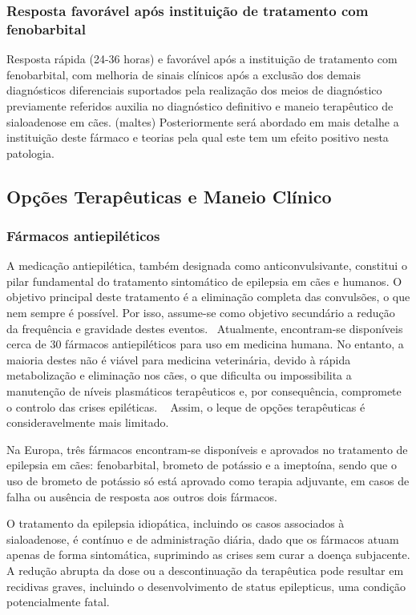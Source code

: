 \subsubsection{Resposta favorável após instituição de tratamento com fenobarbital}

Resposta rápida (24-36 horas) e favorável após a instituição de tratamento com fenobarbital, com melhoria de sinais clínicos após a exclusão dos demais diagnósticos diferenciais suportados pela realização dos meios de diagnóstico previamente referidos auxilia no diagnóstico definitivo e maneio terapêutico de sialoadenose em cães. (maltes) Posteriormente será abordado em mais detalhe a instituição deste fármaco e teorias pela qual este tem um efeito positivo nesta patologia. 

\subsection{Opções Terapêuticas e Maneio Clínico} 


\subsubsection{Fármacos antiepiléticos}


A medicação antiepilética, também designada como anticonvulsivante, constitui o pilar fundamental do tratamento sintomático de epilepsia em cães e humanos. O objetivo principal deste tratamento é a eliminação completa das convulsões, o que nem sempre é possível. Por isso, assume-se como objetivo secundário a redução da frequência e gravidade destes eventos.~\cite{Loscher2022}
Atualmente, encontram-se disponíveis cerca de 30 fármacos antiepiléticos para uso em medicina humana. No entanto, a maioria destes não é viável para medicina veterinária, devido à rápida metabolização e eliminação nos cães, o que dificulta ou impossibilita a manutenção de níveis plasmáticos terapêuticos e, por consequência, compromete o controlo das crises epiléticas. ~\cite{Loscher2022} Assim, o leque de opções terapêuticas é consideravelmente mais limitado. ~\cite{Loscher2022}


Na Europa, três fármacos encontram-se disponíveis e aprovados no tratamento de epilepsia em cães: fenobarbital, brometo de potássio e a imeptoína, sendo que o uso de brometo de potássio só está aprovado como terapia adjuvante, em casos de falha ou ausência de resposta aos outros dois fármacos. ~\cite{Royaux2017}


O tratamento da epilepsia idiopática, incluindo os casos associados à sialoadenose, é contínuo e de administração diária, dado que os fármacos atuam apenas de forma sintomática, suprimindo as crises sem curar a doença subjacente. A redução abrupta da dose ou a descontinuação da terapêutica pode resultar em recidivas graves, incluindo o desenvolvimento de status epilepticus, uma condição potencialmente fatal. 


